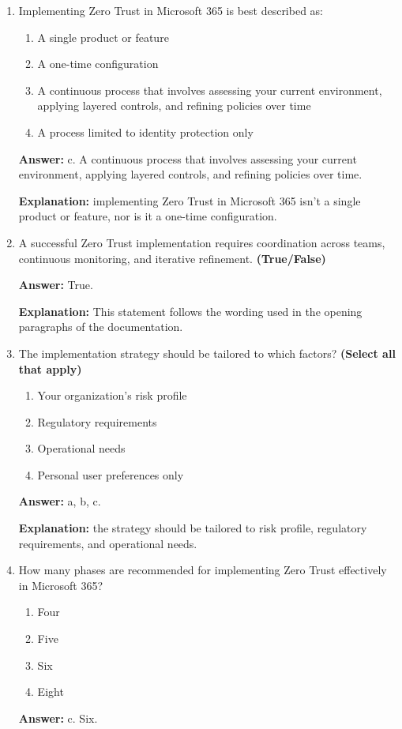 \documentclass[10pt]{article}
\begin{document}
\begin{enumerate}[leftmargin=*]

\item Implementing Zero Trust in Microsoft 365 is best described as:
\begin{enumerate}[label=\alph*., leftmargin=1.5em]
\item A single product or feature
\item A one-time configuration
\item A continuous process that involves assessing your current environment, applying layered controls, and refining policies over time
\item A process limited to identity protection only
\end{enumerate}
\textbf{Answer:} c. A continuous process that involves assessing your current environment, applying layered controls, and refining policies over time.

\textbf{Explanation:} implementing Zero Trust in Microsoft 365 isn't a single product or feature, nor is it a one-time configuration.

\item A successful Zero Trust implementation requires coordination across teams, continuous monitoring, and iterative refinement. \textbf{(True/False)}

\textbf{Answer:} True.

\textbf{Explanation:} This statement follows the wording used in the opening paragraphs of the documentation.

\item The implementation strategy should be tailored to which factors? \textbf{(Select all that apply)}
\begin{enumerate}[label=\alph*., leftmargin=1.5em]
\item Your organization’s risk profile
\item Regulatory requirements
\item Operational needs
\item Personal user preferences only
\end{enumerate}
\textbf{Answer:} a, b, c.

\textbf{Explanation:} the strategy should be tailored to risk profile, regulatory requirements, and operational needs.

\item How many phases are recommended for implementing Zero Trust effectively in Microsoft 365?
\begin{enumerate}[label=\alph*., leftmargin=1.5em]
\item Four
\item Five
\item Six
\item Eight
\end{enumerate}
\textbf{Answer:} c. Six.


\end{enumerate}
\end{document}
